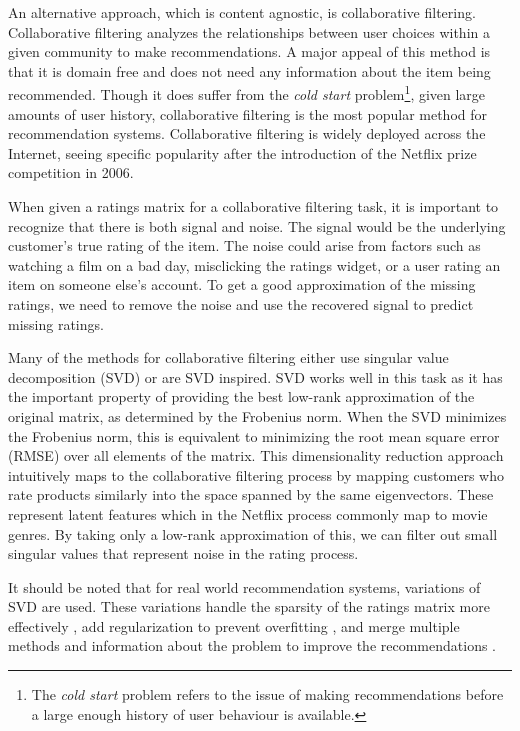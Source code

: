 \documentclass{article} %
\begin{document}
An alternative approach, which is content agnostic, is collaborative filtering.
Collaborative filtering analyzes the relationships between user choices within a given community to make recommendations.
A major appeal of this method is that it is domain free and does not need any information about the item being recommended.
Though it does suffer from the \textit{cold start} problem\footnote{The \textit{cold start} problem refers to the issue of making recommendations before a large enough history of user behaviour is available.}, given large amounts of user history, collaborative filtering is the most popular method for recommendation systems.
Collaborative filtering is widely deployed across the Internet, seeing specific popularity after the introduction of the Netflix prize competition in 2006.

When given a ratings matrix for a collaborative filtering task, it is important to recognize that there is both signal and noise.
The signal would be the underlying customer's true rating of the item.
The noise could arise from factors such as watching a film on a bad day, misclicking the ratings widget, or a user rating an item on someone else's account.
To get a good approximation of the missing ratings, we need to remove the noise and use the recovered signal to predict missing ratings.

Many of the methods for collaborative filtering either use singular value decomposition (SVD) or are SVD inspired.
SVD works well in this task as it has the important property of providing the best low-rank approximation of the original matrix, as determined by the Frobenius norm.
When the SVD minimizes the Frobenius norm, this is equivalent to minimizing the root mean square error (RMSE) over all elements of the matrix.
This dimensionality reduction approach intuitively maps to the collaborative filtering process by mapping customers who rate products similarly into the space spanned by the same eigenvectors.
These represent latent features which in the Netflix process commonly map to movie genres.
By taking only a low-rank approximation of this, we can filter out small singular values that represent noise in the rating process.

It should be noted that for real world recommendation systems, variations of SVD are used.
These variations handle the sparsity of the ratings matrix more effectively \citep{kurucz2007methods}, add regularization to prevent overfitting \citep{zhou2008large}, and merge multiple methods and information about the problem to improve the recommendations \citep{bell2007bellkor}.
\end{document}

